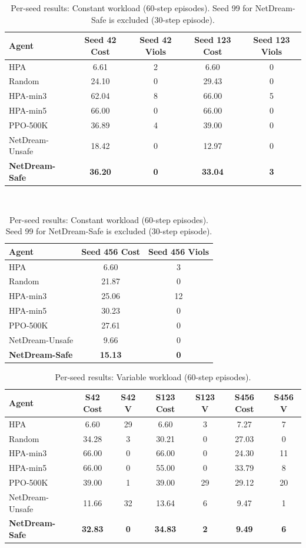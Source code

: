 \begin{table}[H]
\centering
\small
\caption{Per-seed results: Constant workload (60-step episodes).
Seed 99 for NetDream-Safe is excluded (30-step episode).}
\label{tab:perseed-constant}
\setlength{\tabcolsep}{4pt}
\begin{tabular}{@{}lcccc@{}}
\toprule
Agent & Seed 42 Cost & Seed 42 Viols & Seed 123 Cost & Seed 123 Viols \\
\midrule
HPA             & 6.61  & 2 & 6.60  & 0 \\
Random          & 24.10 & 0 & 29.43 & 0 \\
HPA-min3        & 62.04 & 8 & 66.00 & 5 \\
HPA-min5        & 66.00 & 0 & 66.00 & 0 \\
PPO-500K        & 36.89 & 4 & 39.00 & 0 \\
NetDream-Unsafe & 18.42 & 0 & 12.97 & 0 \\
\textbf{NetDream-Safe} & \textbf{36.20} & \textbf{0} & \textbf{33.04} & \textbf{3} \\
\bottomrule
\end{tabular}
\\[4pt]
\begin{tabular}{@{}lcc@{}}
\toprule
Agent & Seed 456 Cost & Seed 456 Viols \\
\midrule
HPA             & 6.60  & 3 \\
Random          & 21.87 & 0 \\
HPA-min3        & 25.06 & 12 \\
HPA-min5        & 30.23 & 0 \\
PPO-500K        & 27.61 & 0 \\
NetDream-Unsafe & 9.66  & 0 \\
\textbf{NetDream-Safe} & \textbf{15.13} & \textbf{0} \\
\bottomrule
\end{tabular}
\end{table}

\begin{table}[H]
\centering
\small
\caption{Per-seed results: Variable workload (60-step episodes).}
\label{tab:perseed-variable}
\setlength{\tabcolsep}{4pt}
\begin{tabular}{@{}lcccccc@{}}
\toprule
Agent & S42 Cost & S42 V & S123 Cost & S123 V & S456 Cost & S456 V \\
\midrule
HPA             & 6.60  & 29 & 6.60  & 3  & 7.27  & 7 \\
Random          & 34.28 & 3  & 30.21 & 0  & 27.03 & 0 \\
HPA-min3        & 66.00 & 0  & 66.00 & 0  & 24.30 & 11 \\
HPA-min5        & 66.00 & 0  & 55.00 & 0  & 33.79 & 8 \\
PPO-500K        & 39.00 & 1  & 39.00 & 29 & 29.12 & 20 \\
NetDream-Unsafe & 11.66 & 32 & 13.64 & 6  & 9.47  & 1 \\
\textbf{NetDream-Safe} & \textbf{32.83} & \textbf{0} & \textbf{34.83} & \textbf{2} & \textbf{9.49} & \textbf{6} \\
\bottomrule
\end{tabular}
\end{table}

